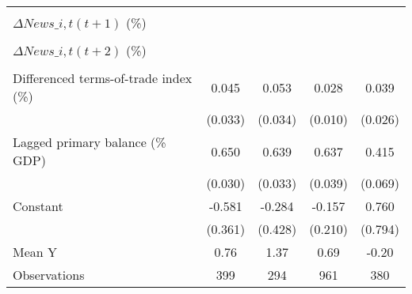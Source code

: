 {\begin{tabular}{l*{4}{c}}
                    &                     &                     &                     &                     \\
\addlinespace
$ \Delta News\_{i,t}(t+1)$ (\%)&                     &                     &                     &                     \\
                    &                     &                     &                     &                     \\
\addlinespace
$ \Delta News\_{i,t}(t+2)$ (\%)&                     &                     &                     &                     \\
                    &                     &                     &                     &                     \\
\addlinespace
Differenced terms-of-trade index (\%)&       0.045         &       0.053         &       0.028\sym{***}&       0.039         \\
                    &     (0.033)         &     (0.034)         &     (0.010)         &     (0.026)         \\
\addlinespace
Lagged primary balance (\% GDP)&       0.650\sym{***}&       0.639\sym{***}&       0.637\sym{***}&       0.415\sym{***}\\
                    &     (0.030)         &     (0.033)         &     (0.039)         &     (0.069)         \\
\addlinespace
Constant            &      -0.581         &      -0.284         &      -0.157         &       0.760         \\
                    &     (0.361)         &     (0.428)         &     (0.210)         &     (0.794)         \\
\midrule
Mean Y              &        0.76         &        1.37         &        0.69         &       -0.20         \\
Observations        &         399         &         294         &         961         &         380         \\
\bottomrule
\end{tabular}
}

